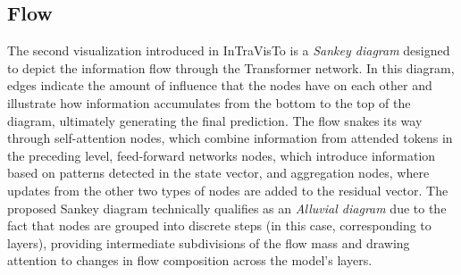 \subsection{Flow}\label{ssec:method_intravisto_flow}

The second visualization introduced in InTraVisTo is a \emph{Sankey diagram} designed to depict the information flow through the Transformer network.
In this diagram, edges indicate the amount of influence that the nodes have on each other and illustrate how information accumulates from the bottom to the top of the diagram, ultimately generating the final prediction.
The flow snakes its way through self-attention nodes, which combine information from attended tokens in the preceding level, feed-forward networks nodes, which introduce information based on patterns detected in the state vector, and aggregation nodes, where updates from the other two types of nodes are added to the residual vector.
The proposed Sankey diagram technically qualifies as an \emph{Alluvial diagram} due to the fact that nodes are grouped into discrete steps (in this case, corresponding to layers), providing intermediate subdivisions of the flow mass and drawing attention to changes in flow composition across the model's layers.

